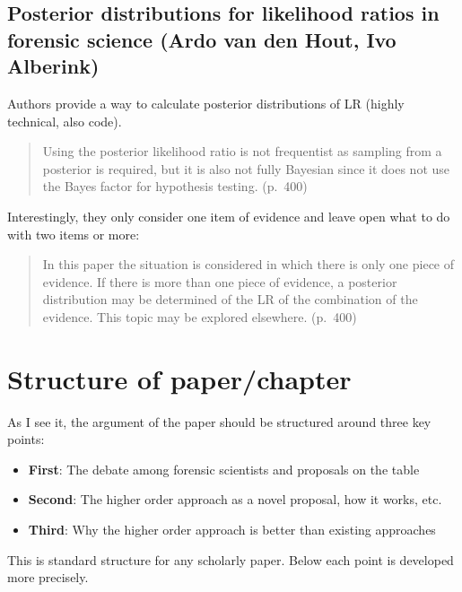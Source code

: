 \documentclass[
  10pt,
  dvipsnames,enabledeprecatedfontcommands]{scrartcl}
\begin{document}
\hypertarget{posterior-distributions-for-likelihood-ratios-in-forensic-science-ardo-van-den-hout-ivo-alberink}{%
\subsection{Posterior distributions for likelihood ratios in forensic
science (Ardo van den Hout, Ivo
Alberink)}\label{posterior-distributions-for-likelihood-ratios-in-forensic-science-ardo-van-den-hout-ivo-alberink}}

Authors provide a way to calculate posterior distributions of LR (highly
technical, also code).

\begin{quote}
Using the posterior likelihood ratio is not frequentist as sampling from
a posterior is required, but it is also not fully Bayesian since it does
not use the Bayes factor for hypothesis testing. (p.~400)
\end{quote}

\noindent Interestingly, they only consider one item of evidence and
leave open what to do with two items or more:

\begin{quote}
In this paper the situation is considered in which there is only one
piece of evidence. If there is more than one piece of evidence, a
posterior distribution may be determined of the LR of the combination of
the evidence. This topic may be explored elsewhere. (p.~400)
\end{quote}

\hypertarget{structure-of-paperchapter}{%
\section{Structure of paper/chapter}\label{structure-of-paperchapter}}

As I see it, the argument of the paper should be structured around three
key points:

\begin{itemize}
\item
  \textbf{First}: The debate among forensic scientists and proposals on
  the table
\item
  \textbf{Second}: The higher order approach as a novel proposal, how it
  works, etc.
\item
  \textbf{Third}: Why the higher order approach is better than existing
  approaches
\end{itemize}

This is standard structure for any scholarly paper. Below each point is
developed more precisely.
\end{document}

